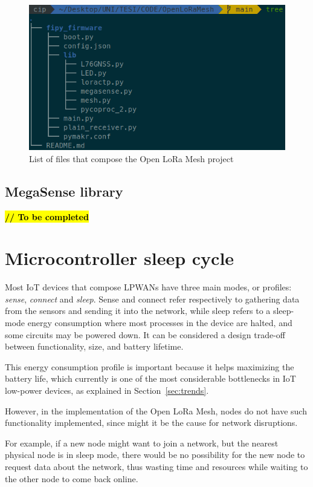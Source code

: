 		\begin{figure}[h]
			\centering
			\includegraphics[width=.8\textwidth]{resources/img/chap5/tree_files}
			\caption{List of files that compose the Open LoRa Mesh project}
			\label{img:files}
		\end{figure}

		\subsection{MegaSense library}\label{subsec:megasense_lib}
		
			\textbf{\textcolor{red}{\hl{// To be completed}}}
		
	\section{Microcontroller sleep cycle}\label{sec:sleep}
	
		Most IoT devices that compose LPWANs have three main modes, or profiles: \textit{sense}, \textit{connect} and \textit{sleep}.
		Sense and connect refer respectively to gathering data from the sensors and sending it into the network, while sleep refers to a sleep-mode energy consumption where most processes in the device are halted, and some circuits may be powered down.
		It can be considered a design trade-off between functionality, size, and battery lifetime.
		
		This energy consumption profile is important because it helps maximizing the battery life, which currently is one of the most considerable bottlenecks in IoT low-power devices, as explained in Section~\ref{sec:trends}.
		
		However, in the implementation of the Open LoRa Mesh, nodes do not have such functionality implemented, since might it be the cause for network disruptions.
		
		For example, if a new node might want to join a network, but the nearest physical node is in sleep mode, there would be no possibility for the new node to request data about the network, thus wasting time and resources while waiting to the other node to come back online.
		

